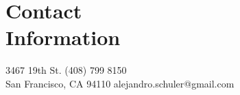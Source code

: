 \section{\mysidestyle Contact\\Information}

    3467 19th St.												\hfill (408) 799 8150\\
    San Francisco, CA 94110										\hfill alejandro.schuler@gmail.com\\
    \vspace{-4mm}